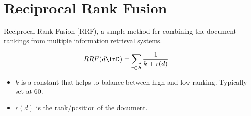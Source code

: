 \section{Reciprocal Rank Fusion }
\label{sec:nlp_rrf}
Reciprocal Rank Fusion (RRF), a simple method for combining the document rankings from multiple information retrieval systems.

\begin{align*}
	RRF(d\inD) = \sum_{r\in R}\frac{1}{k+r(d)}
\end{align*}
\begin{itemize}
	\item $k$ is a constant that helps to balance between high and low ranking. Typically set at 60.
	\item $r(d)$ is the rank/position of the document.
\end{itemize}










